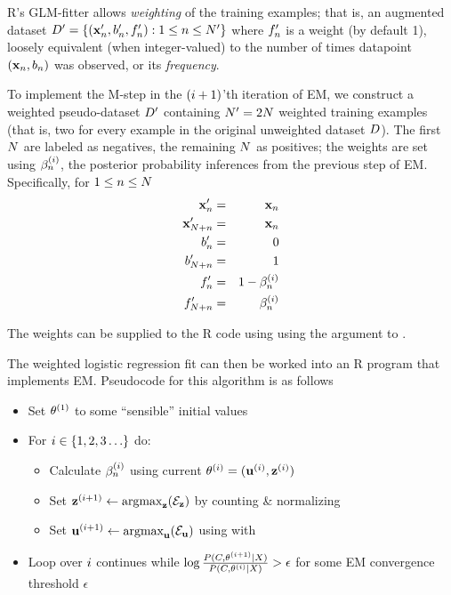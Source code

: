 \documentclass{article}
\begin{document}
R's GLM-fitter allows {\em weighting} of the training examples;
that is, an augmented dataset $D' = \{ ({\bf x}'_{n},b'_{n},f'_{n}): 1 \leq n \leq N' \}$
where $f'_{n}$ is a weight (by default 1),
loosely equivalent (when integer-valued) to the number of times datapoint $({\bf x}_{n},b_{n})$ was observed, or its {\em frequency}.

To implement the M-step in the $(i+1)$'th iteration of EM,
we construct a weighted pseudo-dataset $D'$ containing $N' = 2N$ weighted training examples
(that is, two for every example in the original unweighted dataset $D$).
The first $N$ are labeled as negatives, the remaining $N$ as positives;
the weights are set using $\beta^{(i )}_{n}$, the posterior probability inferences from the previous step of EM.
Specifically, for $1 \leq n \leq N$
\begin{eqnarray*}
  {\bf x}'_{n} & = & {\bf x}_{n} \\
  {\bf x}'_{N+n} & = & {\bf x}_{n} \\
  b'_{n} & = & 0 \\
  b'_{N+n} & = & 1 \\
  f'_{n} & = & 1 - \beta^{(i )}_{n} \\
  f'_{N+n} & = & \beta^{(i )}_{n}
\end{eqnarray*}

The weights can be supplied to the R code using using the  argument to .

The weighted logistic regression fit can then be worked into an R program that implements EM.
Pseudocode for this algorithm is as follows
\begin{itemize}
\item Set $\theta^{(1)}$ to some ``sensible'' initial values
\item For $i \in \{ 1, 2, 3 \ldots \}$ do:
\begin{itemize}
\item Calculate $\beta^{(i )}_{n}$ using current $\theta^{(i)} = ({\bf u}^{(i)},{\bf z}^{(i)})$
\item Set ${\bf z}^{(i+1)} \leftarrow \mbox{argmax}_{{\bf z}} ( {\cal E}_{{\bf z}} )$ by counting \& normalizing
\item Set ${\bf u}^{(i+1)} \leftarrow \mbox{argmax}_{{\bf u}} ( {\cal E}_{{\bf u}} )$ using  with 
\end{itemize}
\item Loop over $i$ continues while $\log \frac{P(C,\theta^{(i+1)}|X)}{P(C,\theta^{(i)}|X)} > \epsilon$
  for some EM convergence threshold $\epsilon$
\end{itemize}



\end{document}
